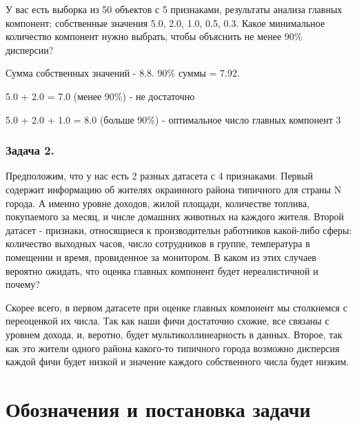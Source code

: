 У вас есть выборка из 50 объектов с 5 признаками, результаты анализа главных компонент: собственные значения 5.0, 2.0, 1.0, 0.5, 0.3. Какое минимальное количество компонент нужно выбрать, чтобы объяснить не менее 90\% дисперсии?

\begin{solution}
    Сумма собственных значений - 8.8. 90\% суммы = 7.92.
    
    5.0 + 2.0 = 7.0 (менее 90\%) - не достаточно

    5.0 + 2.0 + 1.0 = 8.0 (больше 90\%) - оптимальное число главных компонент 3 
\end{solution}
\subsubsection*{Задача 2.}

Предположим, что у нас есть 2 разных датасета с 4 признаками. Первый содержит информацию об жителях окраинного района типичного для страны N города. А именно уровне доходов, жилой площади, количестве топлива, покупаемого за месяц, и числе домашних животных на каждого жителя. Второй датасет - признаки, относящиеся к производительн работников какой-либо сферы: количество выходных часов, число сотрудников в группе, температура в помещении и время, провиденное за монитором. В каком из этих случаев вероятно ожидать, что оценка главных компонент будет нереалистичной и почему?  

\begin{solution}
    Скорее всего, в первом датасете при оценке главных компонент мы столкнемся с переоценкой их числа. Так как наши фичи достаточно схожие, все связаны с уровнем дохода, и, веротно, будет мультиколлинеарность в данных. Второе, так как это жители одного района какого-то типичного города возможно дисперсия каждой фичи будет низкой и значение каждого собственного числа будет низким.
\end{solution}


\section{Обозначения и постановка задачи}

